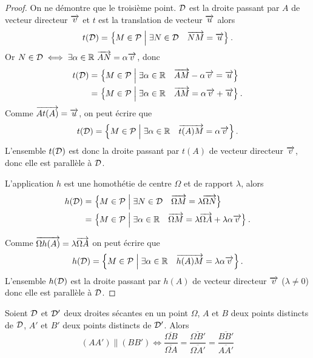 \begin{proof} 
    On ne démontre que le troisième point. \(\mathcal{D}\) est la droite passant par 
    \(A\) de vecteur directeur \(\overrightarrow{v}\) et \(t\) est la translation de vecteur 
    \(\overrightarrow{u}\) alors
    \begin{equation}
        t(\mathcal{D}) = \left\{M \in \mathcal{P}\mathrel{}\middle|\mathrel{}\exists N \in \mathcal{D} \quad \overrightarrow{NM} = \overrightarrow{u}\right\}.
    \end{equation}
    Or \(N \in \mathcal{D} \iff \exists \alpha \in \mathbb{R} \ \overrightarrow{AN} = \alpha \overrightarrow{v}\), donc
    \begin{align}
        t(\mathcal{D})& = \left\{M \in \mathcal{P}\mathrel{}\middle|\mathrel{}\exists \alpha \in \mathbb{R} \quad \overrightarrow{AM}-\alpha 
        \overrightarrow{v} = \overrightarrow{u}\right\} \\
              & = \left\{M \in \mathcal{P}\mathrel{}\middle|\mathrel{}\exists \alpha \in \mathbb{R} \quad \overrightarrow{AM} = 
              \alpha \overrightarrow{v} + \overrightarrow{u}\right\}.
    \end{align}
    Comme \(\overrightarrow{At(A)} = \overrightarrow{u}\), on peut écrire que \begin{equation}
        t(\mathcal{D}) = \left\{M \in \mathcal{P}\mathrel{}\middle|\mathrel{}\exists \alpha \in \mathbb{R} \quad \overrightarrow{t(A)M} = 
        \alpha \overrightarrow{v}\right\}.
    \end{equation}
    L'ensemble \(t(\mathcal{D})\) est donc la droite passant par \(t(A)\) de vecteur 
    directeur \(\overrightarrow{v}\), donc elle est parallèle à \(\mathcal{D}\).

    L'application \(h\) est une homothétie de centre \(\Omega\) et de rapport 
    \(\lambda\), alors
    \begin{align}
        h(\mathcal{D})& = \left\{M \in \mathcal{P}\mathrel{}\middle|\mathrel{}\exists N \in \mathcal{D} \quad \overrightarrow{\Omega M} = 
        \lambda \overrightarrow{\Omega N}\right\}\\
              & = \left\{M \in \mathcal{P}\mathrel{}\middle|\mathrel{}\exists \alpha \in \mathbb{R} \quad \overrightarrow{\Omega M} = 
              \lambda \overrightarrow{\Omega A} + \lambda\alpha \overrightarrow{v}\right\}.
    \end{align}
        
    Comme \(\overrightarrow{\Omega h(A)} = \lambda \overrightarrow{\Omega A}\) on peut écrire que 
    \begin{equation}
        h(\mathcal{D}) = \left\{M \in \mathcal{P}\mathrel{}\middle|\mathrel{}\exists \alpha \in \mathbb{R} \quad \overrightarrow{h(A) M} = 
        \lambda\alpha \overrightarrow{v}\right\}.
    \end{equation}
    L'ensemble \(h(\mathcal{D})\) est la droite passant par \(h(A)\) de vecteur 
    directeur \(\overrightarrow{v}\) (\(\lambda \neq 0\)) donc elle est parallèle à \(\mathcal{D}\).
\end{proof}

\begin{theo}
    Soient \(\mathcal{D}\) et \(\mathcal{D}'\) deux droites sécantes en un point \(\Omega\), 
    \(A\) et \(B\) deux points distincts de \(\mathcal{D}\), \(A'\) et \(B'\) deux 
    points distincts de \(\mathcal{D}'\). Alors
    \begin{equation}
        (AA') \parallel (BB') \iff \frac{\overline{\Omega B}}{\overline{\Omega 
        A}} = \frac{\overline{\Omega B'}}{\overline{\Omega A'}} = 
        \frac{\overline{BB'}}{\overline{AA'}}
    \end{equation}
\end{theo}

